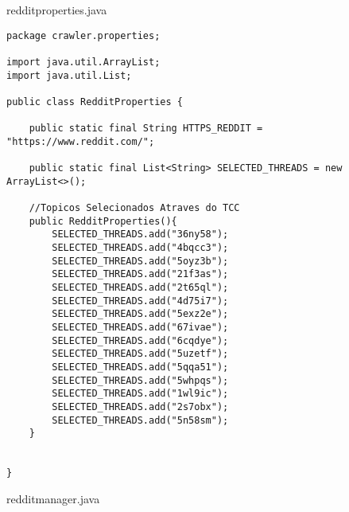 redditproperties.java
\begin{lstlisting}
package crawler.properties;

import java.util.ArrayList;
import java.util.List;

public class RedditProperties {

	public static final String HTTPS_REDDIT = "https://www.reddit.com/";
	
	public static final List<String> SELECTED_THREADS = new ArrayList<>();
	
	//Topicos Selecionados Atraves do TCC
	public RedditProperties(){
		SELECTED_THREADS.add("36ny58");
		SELECTED_THREADS.add("4bqcc3");
		SELECTED_THREADS.add("5oyz3b");
		SELECTED_THREADS.add("21f3as");
		SELECTED_THREADS.add("2t65ql");
		SELECTED_THREADS.add("4d75i7");
		SELECTED_THREADS.add("5exz2e");
		SELECTED_THREADS.add("67ivae");
		SELECTED_THREADS.add("6cqdye");
		SELECTED_THREADS.add("5uzetf");
		SELECTED_THREADS.add("5qqa51");
		SELECTED_THREADS.add("5whpqs");
		SELECTED_THREADS.add("1wl9ic");
		SELECTED_THREADS.add("2s7obx");
		SELECTED_THREADS.add("5n58sm");
	}
	

}
\end{lstlisting}

redditmanager.java

